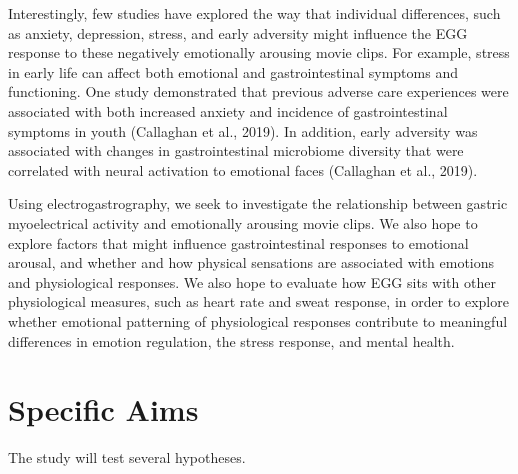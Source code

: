 \documentclass[]{book}
\begin{document}
Interestingly, few studies have explored the way that individual differences, such as anxiety, depression, stress, and early adversity might influence the EGG response to these negatively emotionally arousing movie clips. For example, stress in early life can affect both emotional and gastrointestinal symptoms and functioning. One study demonstrated that previous adverse care experiences were associated with both increased anxiety and incidence of gastrointestinal symptoms in youth (Callaghan et al., 2019). In addition, early adversity was associated with changes in gastrointestinal microbiome diversity that were correlated with neural activation to emotional faces (Callaghan et al., 2019).

Using electrogastrography, we seek to investigate the relationship between gastric myoelectrical activity and emotionally arousing movie clips. We also hope to explore factors that might influence gastrointestinal responses to emotional arousal, and whether and how physical sensations are associated with emotions and physiological responses. We also hope to evaluate how EGG sits with other physiological measures, such as heart rate and sweat response, in order to explore whether emotional patterning of physiological responses contribute to meaningful differences in emotion regulation, the stress response, and mental health.

\hypertarget{specific-aims-1}{%
\section{Specific Aims}\label{specific-aims-1}}

The study will test several hypotheses.
\end{document}
